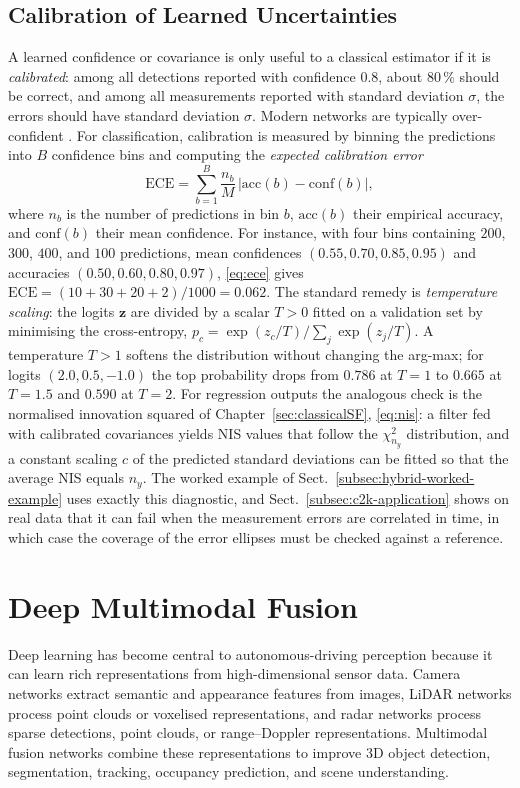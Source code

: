 \subsection{Calibration of Learned Uncertainties}
\label{subsec:calibration}
A learned confidence or covariance is only useful to a classical estimator if it is \emph{calibrated}: among all detections reported with confidence $0.8$, about $80\,\%$ should be correct, and among all measurements reported with standard deviation $\sigma$, the errors should have standard deviation $\sigma$. Modern networks are typically over-confident \cite{guo2017_calibration}. For classification, calibration is measured by binning the predictions into $B$ confidence bins and computing the \emph{expected calibration error}
\begin{equation}
\mathrm{ECE}=\sum_{b=1}^{B}\frac{n_b}{M}\,\big|\mathrm{acc}(b)-\mathrm{conf}(b)\big| ,
\label{eq:ece}
\end{equation}
where $n_b$ is the number of predictions in bin $b$, $\mathrm{acc}(b)$ their empirical accuracy, and $\mathrm{conf}(b)$ their mean confidence. For instance, with four bins containing $200$, $300$, $400$, and $100$ predictions, mean confidences $(0.55,0.70,0.85,0.95)$ and accuracies $(0.50,0.60,0.80,0.97)$, \eqref{eq:ece} gives $\mathrm{ECE}=(10+30+20+2)/1000=0.062$. The standard remedy is \emph{temperature scaling}: the logits $\mathbf{z}$ are divided by a scalar $T>0$ fitted on a validation set by minimising the cross-entropy, $p_c=\exp(z_c/T)/\sum_j\exp(z_j/T)$. A temperature $T>1$ softens the distribution without changing the arg-max; for logits $(2.0,0.5,-1.0)$ the top probability drops from $0.786$ at $T=1$ to $0.665$ at $T=1.5$ and $0.590$ at $T=2$. For regression outputs the analogous check is the normalised innovation squared of Chapter~\ref{sec:classicalSF}, \eqref{eq:nis}: a filter fed with calibrated covariances yields NIS values that follow the $\chi^{2}_{n_y}$ distribution, and a constant scaling $c$ of the predicted standard deviations can be fitted so that the average NIS equals $n_y$. The worked example of Sect.~\ref{subsec:hybrid-worked-example} uses exactly this diagnostic, and Sect.~\ref{subsec:c2k-application} shows on real data that it can fail when the measurement errors are correlated in time, in which case the coverage of the error ellipses must be checked against a reference.

\section{Deep Multimodal Fusion}
%
Deep learning has become central to autonomous-driving perception because it can learn rich representations from high-dimensional sensor data. Camera networks extract semantic and appearance features from images, LiDAR networks process point clouds or voxelised representations, and radar networks process sparse detections, point clouds, or range--Doppler representations. Multimodal fusion networks combine these representations to improve 3D object detection, segmentation, tracking, occupancy prediction, and scene understanding.

